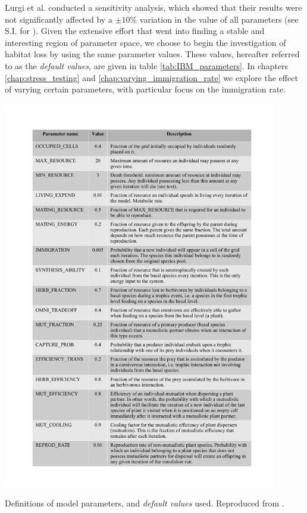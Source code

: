 Lurgi et al. conducted a sensitivity analysis, which showed that their results were not significantly affected by a $\pm 10\%$ variation in the value of all parameters (see S.I. for \cite{lurgi2015effects}). Given the extensive effort that went into finding a stable and interesting region of parameter space, we choose to begin the investigation of habitat loss by using the same parameter values. These values, hereafter referred to as the \emph{default values}, are given in table \ref{tab:IBM_parameters}. In chapters \ref{chap:stress_testing} and \ref{chap:varying_immigration_rate} we explore the effect of varying certain parameters, with particular focus on the immigration rate.


\begin{table}[hp!]
\centering
\includegraphics[width=0.9\textwidth]{"tables/IBM_parameters"}
\caption[Default parameter values.]{Definitions of model parameters, and \emph{default values} used. Reproduced from \cite{lurgi2015effects}.}
\label{tab:IBM_parameters}
\end{table}

